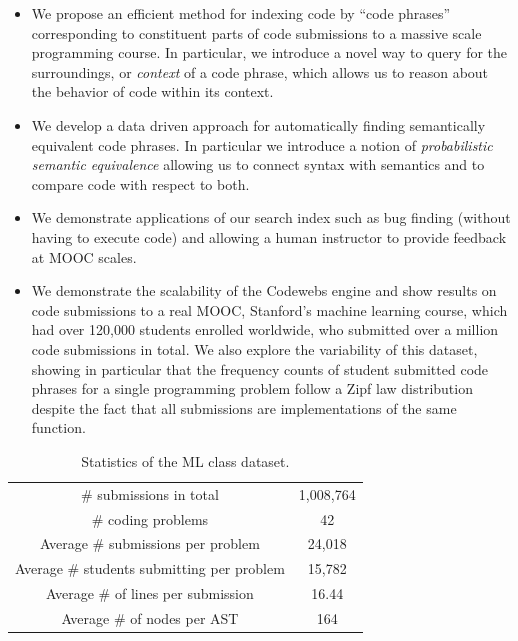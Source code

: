 \begin{itemize}
\item We propose an efficient method for indexing code by ``code phrases'' corresponding to constituent parts
of code submissions to a massive scale programming course.  In particular, we introduce a novel way to query for the surroundings, or \emph{context} of a code phrase, 
which allows us to reason about the behavior of code within its context.
\item We develop a data driven approach for automatically finding semantically equivalent code phrases.
In particular we introduce a notion of \emph{probabilistic semantic equivalence} allowing
us to connect syntax with semantics and to compare code with respect to both.
\item We demonstrate applications of our search index
such as bug finding (without having to execute code) and 
allowing a human instructor to  provide feedback at MOOC scales.
\item We demonstrate the scalability of the Codewebs engine and show results on code submissions to a real MOOC, Stanford's machine learning course,
which  had over 120,000 students enrolled worldwide, who submitted over a million code submissions in total.
We also explore the variability of this dataset, showing in particular that the frequency counts of  
student submitted code phrases for a single programming problem follow a Zipf law distribution despite the
fact that all submissions are implementations of the same function.
\end{itemize}
\begin{table}[t!]
\center
\begin{tabular}{|c|c|}
\hline
   \# submissions in total & 1,008,764 \\
   \# coding problems & 42 \\
    Average \# submissions per problem & 24,018 \\
    Average \# students submitting per problem & 15,782 \\
    Average \# of lines per submission  & 16.44 \\     %
    Average \# of nodes per AST & 164 \\
    \hline
\end{tabular}
\caption{Statistics of the ML class dataset. }
\label{tab:datasetsummary}
\end{table}
